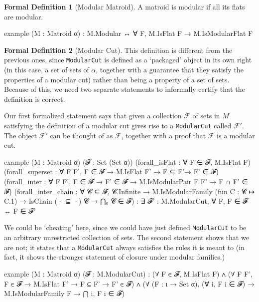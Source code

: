 \documentclass{amsart}
\theoremstyle{plain}
\theoremstyle{definition}
\newcommand{\cF}{\mathcal{F}}
\newcommand{\smalltt}[1]{{\small\texttt{#1}}}
\newtheorem*{fdef}{Formal Definition}
\begin{document}
\begin{fdef}[Modular Matroid]
  A matroid is modular if all its flats are modular. 
  \begin{leancode}
example (M : Matroid α) :
  M.Modular ↔ ∀ F, M.IsFlat F → M.IsModularFlat F
  \end{leancode}
\end{fdef}

\begin{fdef}[Modular Cut]
  This definition is different from the previous ones, 
  since \smalltt{ModularCut} is defined as a `packaged' object
  in its own right
  (in this case, a set of sets of $\alpha$, 
  together with a guarantee that they satisfy the properties
  of a modular cut) 
  rather than being a property of a set of sets. Because of this, 
  we need two separate statements to informally certify that the definition is correct. 
  
  Our first formalized
  statement says that given a collection $\cF$ of sets in $M$ satisfying
  the definition of a modular cut gives rise to a \smalltt{ModularCut} called $\cF'$.
  The object $\cF'$ can be thought of as $\cF$, together with a proof that $\cF$ is a modular cut. 
  \begin{leancode}
example (M : Matroid α) (𝓕 : Set (Set α))
  (forall_isFlat : ∀ F ∈ 𝓕, M.IsFlat F)
  (forall_superset : 
    ∀ F F', F ∈ 𝓕 → M.IsFlat F' → F ⊆ F'→ F' ∈ 𝓕)
  (forall_inter : 
    ∀ F F', F ∈ 𝓕 → F' ∈ 𝓕 → M.IsModularPair F F' → F ∩ F' ∈ 𝓕)
  (forall_inter_chain : 
    ∀ 𝓒 ⊆ 𝓕, 𝓒.Infinite → M.IsModularFamily (fun C : 𝓒 ↦ C.1)
      → IsChain (· ⊆ ·) 𝓒 → ⋂₀ 𝓒 ∈ 𝓕) :
  ∃ 𝓕' : M.ModularCut, ∀ F, F ∈ 𝓕 ↔ F ∈ 𝓕' 
  \end{leancode}
  We could be `cheating' here, since we could have just defined 
  \smalltt{ModularCut} to be an arbitrary unrestricted collection of sets.
  The second statement 
  shows that we are not; it states that a \smalltt{ModularCut} 
  always satisfies the rules it is meant to (in fact, it shows
  the stronger statement of closure under modular families.)
  \begin{leancode}
example (M : Matroid α) (𝓕 : M.ModularCut) :
  (∀ F ∈ 𝓕, M.IsFlat F)
  ∧ (∀ F F', F ∈ 𝓕 → M.IsFlat F' → F ⊆ F' → F' ∈ 𝓕)
  ∧ (∀ (F : ι → Set α), (∀ i, F i ∈ 𝓕) → M.IsModularFamily F → ⋂ i, F i ∈ 𝓕)
  \end{leancode}
\end{fdef}
\end{document}
